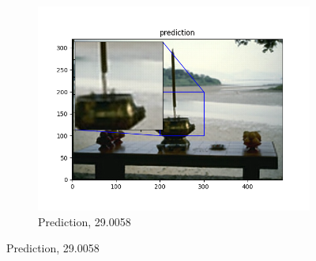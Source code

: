 \documentclass[12pt]{article}
\begin{document}
\begin{figure}[h!]
\begin{subfigure}[b]{0.32\linewidth}
    \includegraphics[width=\linewidth]{./8-prediction.png}
    \caption{Prediction, 29.0058}
  \end{subfigure}


\end{figure}
\end{document}
